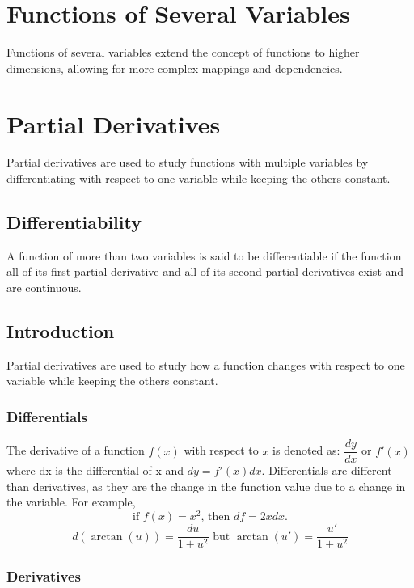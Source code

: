 \documentclass[a4paper,12pt,openany]{book}
\begin{document}
\chapter{Functions of Several Variables}
Functions of several variables extend the concept of functions to higher dimensions, allowing for more complex mappings and dependencies.


\chapter{Partial Derivatives}
Partial derivatives are used to study functions with multiple variables by differentiating with respect to one variable while keeping the others constant.

\section{Differentiability}
A function of more than two variables is said to be
differentiable if the function all of its first partial
derivative and all of its second partial derivatives exist
and are continuous.

\section{Introduction}
Partial derivatives are used to study how a function changes with respect to one variable while keeping the others constant.

\subsection{Differentials}
The derivative of a function \(f(x)\) with respect to \(x\) is denoted as: $\dfrac{dy}{dx}$ or $f'(x)$ where dx is the differential of x and $dy = f'(x)dx$.
Differentials are different than derivatives, as they are the change in the function value due to a change in the variable. For example,
\[
\text{if }f(x) = x^2\text{, then } df = 2xdx\text{.}
\]
\[
d(\arctan(u)) = \dfrac{du}{1+u^2}\text{ but }\arctan(u') = \dfrac{u'}{1+u^2}
\]
\subsection{Derivatives}
\end{document}
